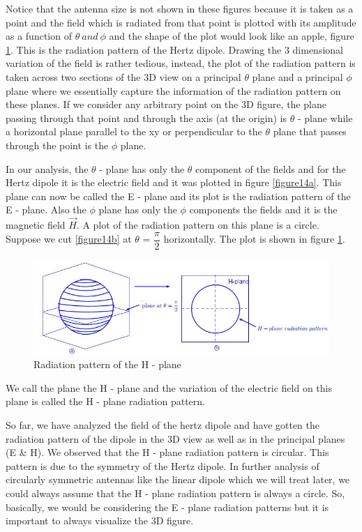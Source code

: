 Notice that the antenna size is not shown in these figures because it is taken as a point and the field which is radiated from that point is plotted with its amplitude as a function of $\theta \ and \ \phi$ and the shape of the plot would look like an apple, figure \ref{figure15}. This is the radiation pattern of the Hertz dipole. Drawing the 3 dimensional variation of the field is rather tedious, instead, the plot of the radiation pattern is taken across two sections of the 3D view on a principal $\theta$ plane and a principal $\phi$ plane where we essentially capture the information of the radiation pattern on these planes. If we consider any arbitrary point on the 3D figure, the plane passing through that point and through the axis (at the origin) is $\theta$ - plane while a horizontal plane parallel to the xy or perpendicular to the $\theta$ plane that passes through the point is the $\phi$ plane. 

In our analysis, the $\theta$ - plane has only the $\theta$ component of the fields and for the Hertz dipole it is the electric field and it was plotted in figure \ref{figure14a}. This plane can now be called the E - plane and its plot is the radiation pattern of the E - plane. Also the $\phi$ plane has only the $\phi$ components the fields and it is the magnetic field $\vec{H}$. A plot of the radiation pattern on this plane is a circle. Suppose we cut \ref{figure14b} at $\theta$ = $\dfrac{\pi}{2}$ horizontally. The plot is shown in figure \ref{figure15}.
\begin{figure}[h]
\centering
\includegraphics[width=0.8\linewidth]{./graphics/diagram4}
\caption{Radiation pattern of the H - plane}
\label{figure15}
\end{figure}

We call the plane the H - plane and the variation of the electric field on this plane is called the H - plane radiation pattern. 

So far, we have analyzed the field of the hertz dipole and have gotten the radiation pattern of the dipole in the 3D view as well as in the principal planes (E \& H). We observed that the H - plane radiation pattern is circular. This pattern is due to the symmetry of the Hertz dipole. In further analysis of circularly symmetric antennas like the linear dipole which we will treat later, we could always assume that the H - plane radiation pattern is always a circle. So, basically, we would be considering the E - plane radiation patterns but it is important to always visualize the 3D figure.

